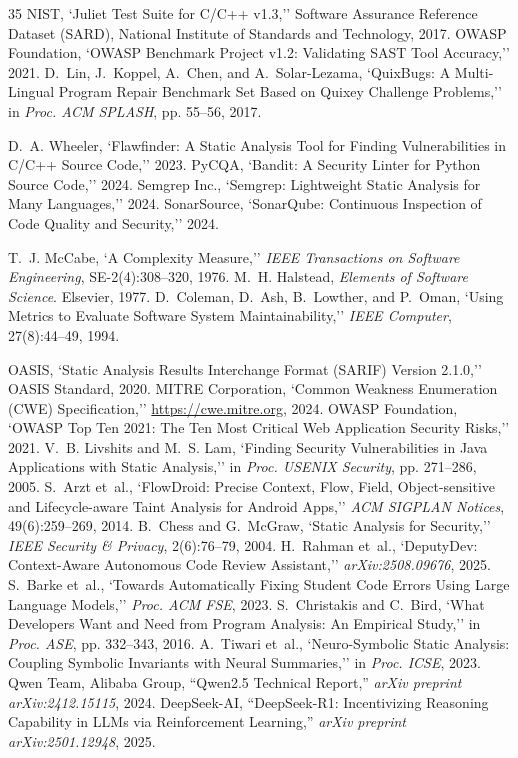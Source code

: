 \documentclass[10pt,conference]{IEEEtran}
\begin{document}
\begin{thebibliography}{35}
 NIST, `Juliet Test Suite for C/C++ v1.3,'' Software Assurance Reference Dataset (SARD), National Institute of Standards and Technology, 2017.
 OWASP Foundation, `OWASP Benchmark Project v1.2: Validating SAST Tool Accuracy,'' 2021.
 D.~Lin, J.~Koppel, A.~Chen, and A.~Solar-Lezama, `QuixBugs: A Multi-Lingual Program Repair Benchmark Set Based on Quixey Challenge Problems,'' in \emph{Proc. ACM SPLASH}, pp. 55--56, 2017.

 D.~A. Wheeler, `Flawfinder: A Static Analysis Tool for Finding Vulnerabilities in C/C++ Source Code,'' 2023.
 PyCQA, `Bandit: A Security Linter for Python Source Code,'' 2024.
 Semgrep Inc., `Semgrep: Lightweight Static Analysis for Many Languages,'' 2024.
 SonarSource, `SonarQube: Continuous Inspection of Code Quality and Security,'' 2024.

 T.~J. McCabe, `A Complexity Measure,'' \emph{IEEE Transactions on Software Engineering}, SE-2(4):308--320, 1976.
 M.~H. Halstead, \emph{Elements of Software Science}. Elsevier, 1977.
 D.~Coleman, D.~Ash, B.~Lowther, and P.~Oman, `Using Metrics to Evaluate Software System Maintainability,'' \emph{IEEE Computer}, 27(8):44--49, 1994.

 OASIS, `Static Analysis Results Interchange Format (SARIF) Version 2.1.0,'' OASIS Standard, 2020.
 MITRE Corporation, `Common Weakness Enumeration (CWE) Specification,'' \url{https://cwe.mitre.org}, 2024.
 OWASP Foundation, `OWASP Top Ten 2021: The Ten Most Critical Web Application Security Risks,'' 2021.
 V.~B. Livshits and M.~S. Lam, `Finding Security Vulnerabilities in Java Applications with Static Analysis,'' in \emph{Proc. USENIX Security}, pp. 271--286, 2005.
 S.~Arzt et~al., `FlowDroid: Precise Context, Flow, Field, Object-sensitive and Lifecycle-aware Taint Analysis for Android Apps,'' \emph{ACM SIGPLAN Notices}, 49(6):259--269, 2014.
 B.~Chess and G.~McGraw, `Static Analysis for Security,'' \emph{IEEE Security \& Privacy}, 2(6):76--79, 2004.
 H.~Rahman et~al., `DeputyDev: Context-Aware Autonomous Code Review Assistant,'' \emph{arXiv:2508.09676}, 2025.
 S.~Barke et~al., `Towards Automatically Fixing Student Code Errors Using Large Language Models,'' \emph{Proc. ACM FSE}, 2023.
 S.~Christakis and C.~Bird, `What Developers Want and Need from Program Analysis: An Empirical Study,'' in \emph{Proc. ASE}, pp. 332--343, 2016.
 A.~Tiwari et~al., `Neuro-Symbolic Static Analysis: Coupling Symbolic Invariants with Neural Summaries,'' in \emph{Proc. ICSE}, 2023.
 Qwen Team, Alibaba Group, ``Qwen2.5 Technical Report,'' \emph{arXiv preprint arXiv:2412.15115}, 2024.
 DeepSeek-AI, ``DeepSeek-R1: Incentivizing Reasoning Capability in LLMs via Reinforcement Learning,'' \emph{arXiv preprint arXiv:2501.12948}, 2025.
\end{thebibliography}
\end{document}
